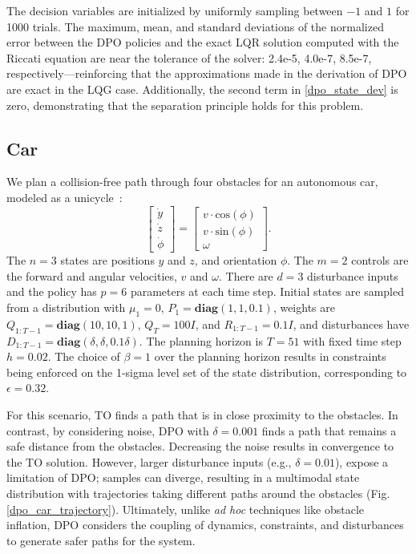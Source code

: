 The decision variables are initialized by uniformly sampling between $-1$ and $1$ for 1000 trials. The maximum, mean, and standard deviations of the normalized error between the DPO policies and the exact LQR solution computed with the Riccati equation are near the tolerance of the solver: 2.4e-5, 4.0e-7, 8.5e-7, respectively---reinforcing that the approximations made in the derivation of DPO are exact in the LQG case. Additionally, the second term in \eqref{dpo_state_dev} is zero, demonstrating that the separation principle holds for this problem.

\subsection{Car}
We plan a collision-free path through four obstacles for an autonomous car, modeled as a unicycle~\cite{lavalle2006planning}:
\begin{equation}
	\begin{bmatrix} \dot{y} \\ \dot{z} \\ \dot{\phi} \end{bmatrix} = \begin{bmatrix} v \cdot \text{cos}(\phi) \\ v \cdot \text{sin}(\phi) \\ \omega \end{bmatrix}. \label{dpo_unicycle_dynamics}
\end{equation}
The $n = 3$ states are positions $y$ and $z$, and orientation $\phi$. The $m = 2$ controls are the forward and angular velocities, $v$ and $\omega$. There are $d = 3$ disturbance inputs and the policy has $p = 6$ parameters at each time step. Initial states are sampled from a distribution with $\mu_1 = 0$, $P_1 = \textbf{diag}(1,1,0.1)$, weights are $Q_{1:T-1} = \textbf{diag}(10,10,1)$, $Q_T = 100I$, and $R_{1:T-1} = 0.1I$, and disturbances have $D_{1:T-1} = \textbf{diag}(\delta, \delta, 0.1\delta)$. The planning horizon is $T = 51$ with fixed time step $h = 0.02$. The choice of $\beta = 1$ over the planning horizon results in constraints being enforced on the 1-sigma level set of the state distribution, corresponding to $\epsilon = 0.32$.

For this scenario, TO finds a path that is in close proximity to the obstacles. In contrast, by considering noise, DPO with $\delta = 0.001$ finds a path that remains a safe distance from the obstacles. Decreasing the noise results in convergence to the TO solution. However, larger disturbance inputs (e.g., $\delta = 0.01$), expose a limitation of DPO;  samples can diverge, resulting in a multimodal state distribution with trajectories taking different paths around the obstacles (Fig. \ref{dpo_car_trajectory}). Ultimately, unlike \textit{ad hoc} techniques like obstacle inflation, DPO considers the coupling of dynamics, constraints, and disturbances to generate safer paths for the system.

